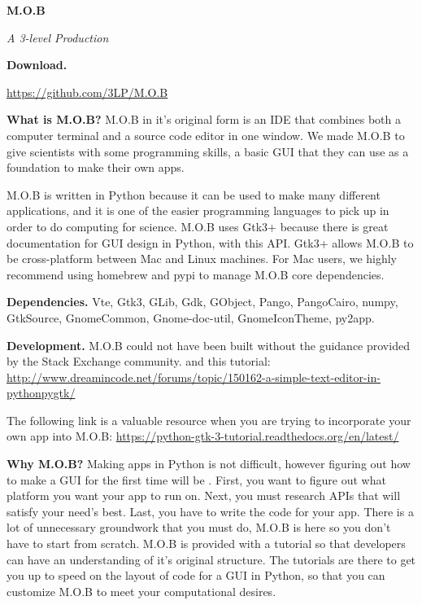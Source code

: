 \documentclass[12pt]{article}
\begin{document}
\begin{center}{\Huge{\textbf{M.O.B}}} \end{center}

\begin{center} \textit{A 3-level Production}\end{center}


\begin{multicols}{2}

\textbf{Download.}

{\footnotesize{\url{https://github.com/3LP/M.O.B}}}

\vspace{0.25cm}

\textbf{What is M.O.B?}  M.O.B in it's original form is an IDE that combines both a computer terminal and a source code editor in one window.  We made M.O.B to give scientists with some programming skills, a basic GUI that they can use as a foundation to make their own apps.

\indent M.O.B is written in Python because it can be used to make many different applications, and it is one of the easier programming languages to pick up in order to do computing for science.  M.O.B uses Gtk3+ because there is great documentation for GUI design in Python, with this API.  Gtk3+ allows M.O.B to be cross-platform between Mac and Linux machines.  For Mac users, we highly recommend using homebrew and pypi to manage M.O.B core dependencies.   


\textbf{Dependencies.} Vte, Gtk3,  GLib, Gdk, GObject, Pango, PangoCairo, numpy, GtkSource, GnomeCommon, Gnome-doc-util, GnomeIconTheme, py2app.


\textbf{Development.} M.O.B could not have been built without the guidance provided by the Stack Exchange community. and this tutorial:  {\footnotesize{\url{http://www.dreamincode.net/forums/topic/150162-a-simple-text-editor-in-pythonpygtk/}}}


\indent The following link is a valuable resource when you are trying to incorporate your own app into M.O.B:    {\footnotesize{\url{https://python-gtk-3-tutorial.readthedocs.org/en/latest/}}}
 
 
\textbf{Why M.O.B?}  Making apps in Python is not difficult, however figuring out how to make a GUI for the first time will be .  First, you want to figure out what platform you want your app to run on. Next, you must research APIs that will satisfy your need's best.  Last, you have to write the code for your app.  There is a lot of unnecessary groundwork that you must do, M.O.B is here so you don't have to start from scratch.  M.O.B is provided with a tutorial so that developers can have an understanding of it's original structure.  The tutorials are there to get you up to speed on the layout of code for a GUI in Python, so that you can customize M.O.B to meet your computational desires.  

\end{multicols}
\end{document}
